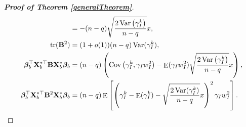 \documentclass[11pt]{article}
\DeclareMathOperator{\mytr}{tr}
\DeclareMathOperator{\myE}{E}
\DeclareMathOperator{\myVar}{Var}
\DeclareMathOperator{\myCov}{Cov}
\newcommand{\bfsym}[1]{\ensuremath{\boldsymbol{#1}}}
\def\bbeta{\bfsym \beta}
\theoremstyle{plain}
\theoremstyle{definition}
\theoremstyle{remark}
\begin{document}
\begin{appendices}
\begin{proof}[\textbf{Proof of Theorem \ref{generalTheorem}}]
\begin{align*}
    &=
    -(n-q)
     \sqrt{
         \frac{
             2\myVar\left( \gamma_I^k \right)
         }{
             n-q
         }
    } 
    x,
    \\
    \mytr(\BB^2) &= (1+o(1)) ( n-q ) \myVar ( \gamma_I^k ),
    \\
        \bbeta_b^\top
        \BX_b^{*\top}
        \BB
        \BX_b^*
        \bbeta_b
        &= 
        (n-q)\left( 
            \myCov\left( \gamma_I^k, \gamma_I w_I^2 \right)
            -
            \myE (\gamma_I w_I^2)
            \sqrt{\frac{2\myVar\left( \gamma_I^k \right)}{n-q}} 
            x
        \right),
    \\
        \bbeta_b^\top
        \BX_b^{*\top}
        \BB^2
        \BX_b^*
        \bbeta_b
    &=
    (n-q) \myE\left[ 
        \left( \gamma_I^k -\myE(\gamma_I^k) -\sqrt{\frac{2\myVar (\gamma_I^k)}{n-q}}x \right)^2
        \gamma_I w_I^2
    \right]
    .
\end{align*}



\end{proof}





 



\end{appendices}





\end{document}
